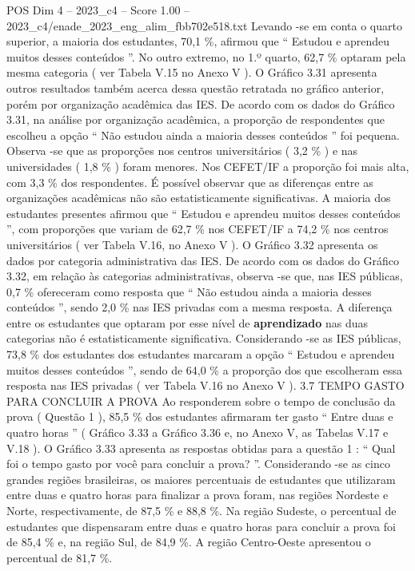 \begin{textsample}{POS Dim 4 – 2023\_c4 – Score 1.00 – 2023\_c4/enade\_2023\_eng\_alim\_fbb702e518.txt}
Levando -se em conta o quarto superior, a maioria dos estudantes, 70,1 \%, afirmou que “ Estudou e aprendeu muitos desses conteúdos ”.
No outro extremo, no 1.º quarto, 62,7 \% optaram pela mesma categoria ( ver Tabela V.15 no Anexo V ).
O Gráfico 3.31 apresenta outros resultados também acerca dessa questão retratada no gráfico anterior, porém por organização acadêmica das IES.
De acordo com os dados do Gráfico 3.31, na análise por organização acadêmica, a proporção de respondentes que escolheu a opção “ Não estudou ainda a maioria desses conteúdos ” foi pequena.
Observa -se que as proporções nos centros universitários ( 3,2 \% ) e nas universidades ( 1,8 \% ) foram menores.
Nos CEFET/IF a proporção foi mais alta, com 3,3 \% dos respondentes.
É possível observar que as diferenças entre as organizações acadêmicas não são estatisticamente significativas.
A maioria dos estudantes presentes afirmou que “ Estudou e aprendeu muitos desses conteúdos ”, com proporções que variam de 62,7 \% nos CEFET/IF a 74,2 \% nos centros universitários ( ver Tabela V.16, no Anexo V ).
O Gráfico 3.32 apresenta os dados por categoria administrativa das IES.
De acordo com os dados do Gráfico 3.32, em relação às categorias administrativas, observa -se que, nas IES públicas, 0,7 \% ofereceram como resposta que “ Não estudou ainda a maioria desses conteúdos ”, sendo 2,0 \% nas IES privadas com a mesma resposta.
A diferença entre os estudantes que optaram por esse nível de \textbf{aprendizado} nas duas categorias não é estatisticamente significativa.
Considerando -se as IES públicas, 73,8 \% dos estudantes dos estudantes marcaram a opção “ Estudou e aprendeu muitos desses conteúdos ”, sendo de 64,0 \% a proporção dos que escolheram essa resposta nas IES privadas ( ver Tabela V.16 no Anexo V ). 3.7 TEMPO GASTO PARA CONCLUIR A PROVA Ao responderem sobre o tempo de conclusão da prova ( Questão 1 ), 85,5 \% dos estudantes afirmaram ter gasto “ Entre duas e quatro horas ” ( Gráfico 3.33 a Gráfico 3.36 e, no Anexo V, as Tabelas V.17 e V.18 ).
O Gráfico 3.33 apresenta as respostas obtidas para a questão 1 : “ Qual foi o tempo gasto por você para concluir a prova? ”.
Considerando -se as cinco grandes regiões brasileiras, os maiores percentuais de estudantes que utilizaram entre duas e quatro horas para finalizar a prova foram, nas regiões Nordeste e Norte, respectivamente, de 87,5 \% e 88,8 \%.
Na região Sudeste, o percentual de estudantes que dispensaram entre duas e quatro horas para concluir a prova foi de 85,4 \% e, na região Sul, de 84,9 \%.
A região Centro-Oeste apresentou o percentual de 81,7 \%.

\end{textsample}
